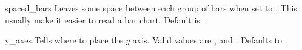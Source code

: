 \constructorblurb{\thisname}

\begin{AttrDecl}{spaced\_bars}
Leaves some space between each group of bars when set to .
This usually make it easier to read a bar chart. Default is
.
\end{AttrDecl}

\begin{AttrDecl}{y\_axes}
Tells \thisclass where to place the $y$ axis. Valid values are
,  and . Defaults to
.
\end{AttrDecl}

